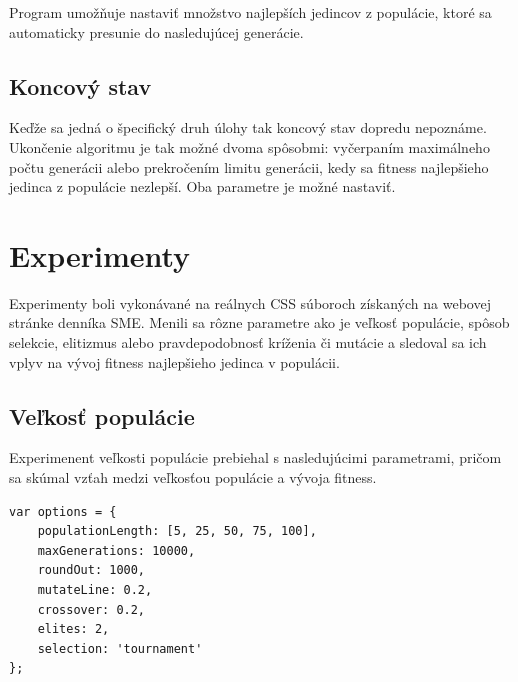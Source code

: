 Program umožňuje nastaviť množstvo najlepších jedincov z populácie, ktoré sa automaticky presunie do nasledujúcej generácie.


\subsection{Koncový stav} %
\label{sub:koncov_stav}

Keďže sa jedná o špecifický druh úlohy tak koncový stav dopredu nepoznáme. Ukončenie algoritmu je tak možné dvoma spôsobmi: vyčerpaním maximálneho počtu generácii alebo prekročením limitu generácii, kedy sa fitness najlepšieho jedinca z populácie nezlepší. Oba parametre je možné nastaviť.



\section{Experimenty} %
\label{sec:experimenty}

Experimenty boli vykonávané na reálnych CSS súboroch získaných na webovej stránke denníka SME. Menili sa rôzne parametre ako je veľkosť populácie, spôsob selekcie, elitizmus alebo pravdepodobnosť kríženia či mutácie a sledoval sa ich vplyv na vývoj fitness najlepšieho jedinca v populácii.

\subsection{Veľkosť populácie} %
\label{sub:ve_kos_popul_cie}

Experimenent veľkosti populácie prebiehal s nasledujúcimi parametrami, pričom sa skúmal vzťah medzi veľkosťou populácie a vývoja fitness.

\begin{verbatim}
var options = {
    populationLength: [5, 25, 50, 75, 100],
    maxGenerations: 10000,
    roundOut: 1000,
    mutateLine: 0.2,
    crossover: 0.2,
    elites: 2,
    selection: 'tournament'
};
\end{verbatim}

